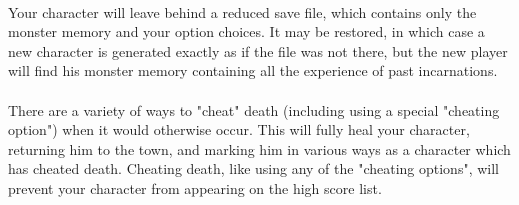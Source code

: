 \paragraph{}Your character will leave behind a reduced save file, which
contains only the monster memory and your option choices. It may be
restored, in which case a new character is generated exactly as if the
file was not there, but the new player will find his monster memory
containing all the experience of past incarnations.

\paragraph{}There are a variety of ways to "cheat" death (including
using a special "cheating option") when it would otherwise occur. This
will fully heal your character, returning him to the town, and marking
him in various ways as a character which has cheated death. Cheating
death, like using any of the "cheating options", will prevent your
character from appearing on the high score list.


